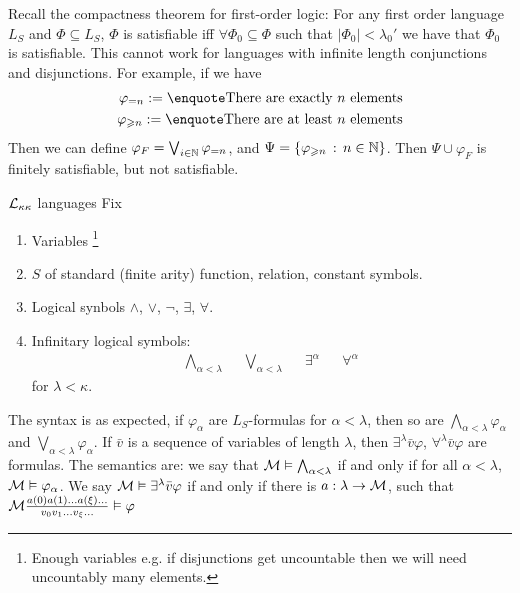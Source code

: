 \documentclass{article}
\begin{document}
Recall the compactness theorem for first-order logic: For any first order language $L_{S}$ and $\Phi \subseteq L_{S}$, $\Phi$ is satisfiable iff $\forall \Phi_{0} \subseteq \Phi$ such that $|\Phi_{0}| < \lambda_{0}'$ we have that $\Phi_{0}$ is satisfiable. This cannot work for languages with infinite length conjunctions and disjunctions.  For example, if we have \begin{align*}
    \varphi_{=n} := \text{\say{There are exactly $n$ elements}}\\
    \varphi_{\geq n} := \text{\say{There are at least $n$ elements}}
\end{align*}
Then we can define $\varphi_{F} = \bigvee_{i \in \mathbb{N}} \varphi_{=n}$, and $\Psi = \{ \varphi_{\geqslant n} \, : \, n \in \mathbb{N}\}$. Then $\Psi \cup \varphi_{F}$ is finitely satisfiable, but not satisfiable.\gap 
\begin{fancydefine}{$\mathcal{L}_{\kappa \kappa}$ languages}
    Fix \begin{enumerate}
        \item Variables \footnote{Enough variables e.g. if disjunctions get uncountable then we will need uncountably many elements.}
        \item $S$ of standard (finite arity) function, relation, constant symbols.
        \item Logical synbols $\wedge$, $\vee$, $\neg$, $\exists$, $\forall$.
        \item Infinitary logical symbols: \begin{align*}
            \bigwedge_{\alpha < \lambda} && \bigvee_{\alpha < \lambda} && \exists^{\alpha} && \forall^{\alpha}
        \end{align*}
        for $\lambda < \kappa$.
    \end{enumerate}
    The syntax is as expected, if $\varphi_{\alpha}$ are $L_{S}$-formulas for $\alpha < \lambda$, then so are $\bigwedge_{\alpha<\lambda} \varphi_{\alpha}$ and $\bigvee_{\alpha<\lambda} \varphi_{\alpha}$. If $\bar{v}$ is a sequence of variables of length $\lambda$, then $\exists^{\lambda} \bar{v} \varphi$, $\forall^{\lambda}\bar{v} \varphi$ are formulas. \gap 
    The semantics are: we say that $\mathcal{M} \vDash \bigwedge_{\alpha<\lambda}$ if and only if for all $\alpha<\lambda$, $\mathcal{M} \vDash \varphi_{\alpha}$. We say $\mathcal{M} \vDash \exists^{\lambda}\bar{v}\varphi$ 
    if and only if there is $a: \lambda \to \mathcal{M}$, such that $\mathcal{M} \frac{a(0)a(1)\dots a(\xi) \dots}{v_{0}v_{1}\dots v_{\xi}\dots} \vDash \varphi$
\end{fancydefine}
\end{document}
